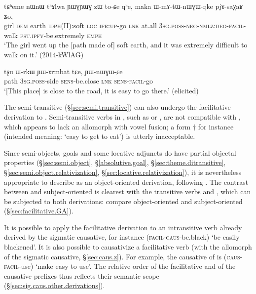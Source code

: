 \begin{exe}
\ex \label{ex:WmAtWnWGWNke}
\gll  tɕʰeme nɯnɯ tʰɤlwa ɲɯɣɲɯɣ zɯ to-ɕe qʰe, maka ɯ-mɤ-tɯ-nɯɣɯ-ŋke pjɤ-saχaʁ ʑo, \\
girl \textsc{dem} earth \textsc{idph}(II):soft \textsc{loc} \textsc{ifr}:\textsc{up}-go \textsc{lnk} at.all \textsc{3sg}.\textsc{poss}-\textsc{neg}-\textsc{nmlz}:\textsc{deg}-\textsc{facil}-walk \textsc{pst}.\textsc{ipfv}-be.extremely \textsc{emph} \\
\glt `The girl went up the [path made of] soft earth, and it was extremely difficult to walk on it.' (2014-kWlAG)
\end{exe}

\begin{exe}
\ex \label{ex:YWnWGWCe}
\gll  tʂu ɯ-rkɯ ɲɯ-ɤrmbat tɕe, ɲɯ-nɯɣɯ-ɕe \\
path \textsc{3sg}.\textsc{poss}-side \textsc{sens}-be.close \textsc{lnk} \textsc{sens}-\textsc{facil}-go \\
\glt `[This place] is close to the road, it is easy to go there.' (elicited)
\end{exe}

The semi-transitive  (§\ref{sec:semi.transitive}) can also undergo the facilitative derivation to . Semi-transitive verbs in , such as  or , are not compatible with , which appears to lack an allomorph with vowel fusion; a form $\dagger$ for instance (intended meaning: `easy to get to eat') is utterly inacceptable.

    
Since semi-objects, goals and some locative adjuncts do have partial objectal properties (§\ref{sec:semi.object}, §\ref{absolutive.goal}, §\ref{sec:theme.ditransitive}, §\ref{sec:semi.object.relativization}, §\ref{sec:locative.relativization}), it is nevertheless appropriate to describe  as an object-oriented derivation, following \citet{jackson14morpho}. The contrast between  and subject-oriented  is clearest with the transitive verbs  and , which can be subjected to both derivations: compare object-oriented  and subject-oriented   (§\ref{sec:facilitative.GA}).

It is possible to apply the facilitative derivation to an intransitive verb already derived by the sigmatic causative, for instance  (\textsc{facil}-\textsc{caus}-be.black) `be easily blackened'. It is also possible to causativize a facilitative verb (with the  allomorph of the sigmatic causative, §\ref{sec:caus.z}). For example, the causative of  is  (\textsc{caus}-\textsc{facil}-use) `make easy to use'. The relative order of the facilitative and of the causative prefixes thus reflects their semantic scope (§\ref{sec:sig.caus.other.derivations}).


